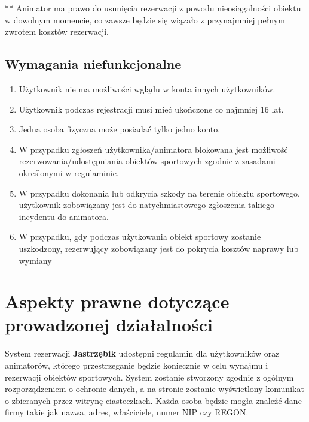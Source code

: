 \documentclass[a4paper,11pt]{article}
\begin{document}
    \small{** Animator ma prawo do usunięcia rezerwacji z powodu nieosiągalności obiektu w dowolnym momencie, co zawsze będzie się wiązało z przynajmniej pełnym zwrotem kosztów rezerwacji. }

    \subsection{Wymagania niefunkcjonalne}

    \begin{enumerate}
    	\item Użytkownik nie ma możliwości wglądu w konta innych użytkowników.
    	\item Użytkownik podczas rejestracji musi mieć ukończone co najmniej 16 lat.
    	\item Jedna osoba fizyczna może posiadać tylko jedno konto.
    	\item W przypadku zgłoszeń użytkownika/animatora blokowana jest możliwość rezerwowania/udostępniania obiektów sportowych zgodnie z zasadami określonymi w regulaminie.
    	\item W przypadku dokonania lub odkrycia szkody na terenie obiektu sportowego, użytkownik zobowiązany jest do natychmiastowego zgłoszenia takiego incydentu do animatora.
    	\item W przypadku, gdy podczas użytkowania obiekt sportowy zostanie uszkodzony, rezerwujący zobowiązany jest do pokrycia kosztów naprawy lub wymiany
    \end{enumerate}


\section{Aspekty prawne dotyczące prowadzonej działalności}

System rezerwacji \textbf{Jastrzębik} udostępni regulamin dla użytkowników oraz animatorów, którego przestrzeganie będzie koniecznie w celu wynajmu i rezerwacji obiektów sportowych. System zostanie stworzony zgodnie z ogólnym rozporządzeniem o ochronie danych, a na stronie zostanie wyświetlony komunikat o zbieranych przez witrynę ciasteczkach. Każda osoba będzie mogła znaleźć dane firmy takie jak nazwa, adres, właściciele, numer NIP czy REGON.
\end{document}

